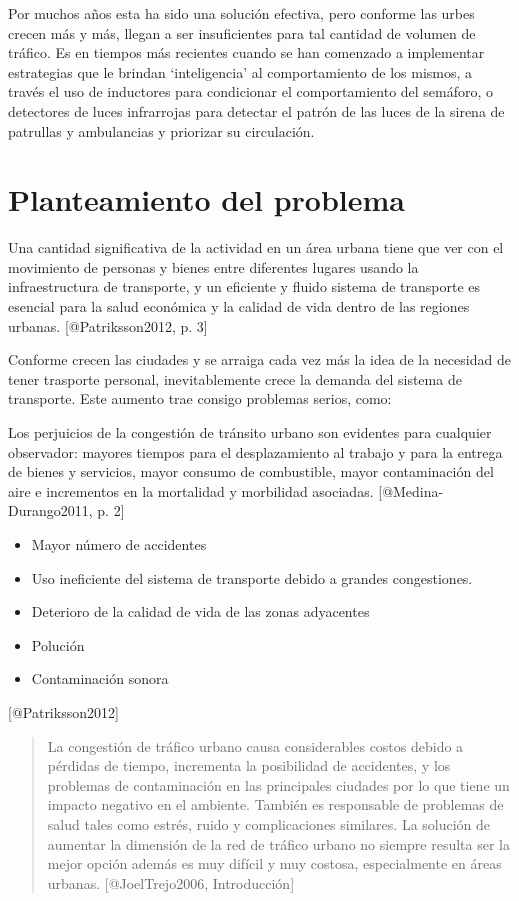 Por muchos años esta ha sido una solución efectiva, pero conforme las
urbes crecen más y más, llegan a ser insuficientes para tal cantidad de
volumen de tráfico. Es en tiempos más recientes cuando se han comenzado
a implementar estrategias que le brindan `inteligencia' al
comportamiento de los mismos, a través el uso de inductores para
condicionar el comportamiento del semáforo, o detectores de luces
infrarrojas para detectar el patrón de las luces de la sirena de
patrullas y ambulancias y priorizar su circulación.

\hypertarget{planteamiento-del-problema}{%
\section{Planteamiento del problema}\label{planteamiento-del-problema}}

Una cantidad significativa de la actividad en un área urbana tiene que
ver con el movimiento de personas y bienes entre diferentes lugares
usando la infraestructura de transporte, y un eficiente y fluido sistema
de transporte es esencial para la salud económica y la calidad de vida
dentro de las regiones urbanas. {[}@Patriksson2012, p. 3{]}

Conforme crecen las ciudades y se arraiga cada vez más la idea de la
necesidad de tener trasporte personal, inevitablemente crece la demanda
del sistema de transporte. Este aumento trae consigo problemas serios,
como:

Los perjuicios de la congestión de tránsito urbano son evidentes para
cualquier observador: mayores tiempos para el desplazamiento al trabajo
y para la entrega de bienes y servicios, mayor consumo de combustible,
mayor contaminación del aire e incrementos en la mortalidad y morbilidad
asociadas. {[}@Medina-Durango2011, p. 2{]}

\begin{itemize}
\item
  Mayor número de accidentes
\item
  Uso ineficiente del sistema de transporte debido a grandes
  congestiones.
\item
  Deterioro de la calidad de vida de las zonas adyacentes
\item
  Polución
\item
  Contaminación sonora
\end{itemize}

{[}@Patriksson2012{]}

\begin{quote}
La congestión de tráfico urbano causa considerables costos debido a
pérdidas de tiempo, incrementa la posibilidad de accidentes, y los
problemas de contaminación en las principales ciudades por lo que tiene
un impacto negativo en el ambiente. También es responsable de problemas
de salud tales como estrés, ruido y complicaciones similares. La
solución de aumentar la dimensión de la red de tráfico urbano no siempre
resulta ser la mejor opción además es muy difícil y muy costosa,
especialmente en áreas urbanas. {[}@JoelTrejo2006, Introducción{]}
\end{quote}


